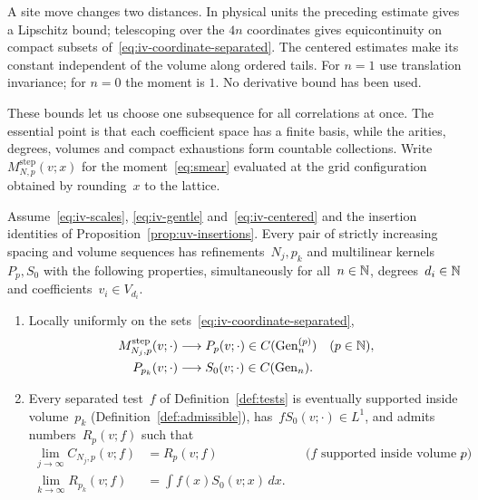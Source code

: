 A site move changes two distances.
In physical units the preceding estimate gives a Lipschitz bound; telescoping over the $4n$ coordinates gives equicontinuity on compact subsets of~\eqref{eq:iv-coordinate-separated}.
The centered estimates make its constant independent of the volume along ordered tails.
For $n=1$ use translation invariance; for $n=0$ the moment is $1$.
No derivative bound has been used.

These bounds let us choose one subsequence for all correlations at once.
The essential point is that each coefficient space has a finite basis, while the arities, degrees, volumes and compact exhaustions form countable collections.
Write~$M^{\mathrm{step}}_{N,p}(v;x)$ for the moment~\eqref{eq:smear} evaluated at the grid configuration obtained by rounding~$x$ to the lattice.

\begin{proposition}\label{prop:iv-raw}
Assume~\eqref{eq:iv-scales}, \eqref{eq:iv-gentle} and~\eqref{eq:iv-centered} and the insertion identities of Proposition~\ref{prop:uv-insertions}.
Every pair of strictly increasing spacing and volume sequences has refinements~$N_j,p_k$ and multilinear kernels~$P_p,S_0$ with the following properties, simultaneously for all~$n\in\mathbb N$, degrees~$d_i\in\mathbb N$ and coefficients~$v_i\in V_{d_i}$.
\begin{enumerate}[label=\textup{(\roman*)},ref=\theproposition(\roman*)]
\item\label{item:iv-raw-points} Locally uniformly on the sets~\eqref{eq:iv-coordinate-separated},
\begin{equation}\label{eq:iv-point-limits}
\begin{aligned}
 M^{\mathrm{step}}_{N_j,p}(v;\cdot)&\longrightarrow P_p(v;\cdot)\in C(\operatorname{Gen}^{(p)}_n)
 &&(p\in\mathbb N),\\
 P_{p_k}(v;\cdot)&\longrightarrow S_0(v;\cdot)\in C(\operatorname{Gen}_n).
\end{aligned}
\end{equation}
\item\label{item:iv-raw-smears} Every separated test~$f$ of Definition~\ref{def:tests} is eventually supported inside volume~$p_k$ (Definition~\ref{def:admissible}), has~$fS_0(v;\cdot)\in L^1$, and admits numbers~$R_p(v;f)$ such that
\begin{equation}\label{eq:iv-auxiliary-limit}
\begin{aligned}
 \lim_{j\to\infty}C_{N_j,p}(v;f)&=R_p(v;f)
 &&\text{($f$ supported inside volume $p$)},\\
 \lim_{k\to\infty}R_{p_k}(v;f)&=\int f(x)S_0(v;x)\,dx.
\end{aligned}
\end{equation}
\end{enumerate}
\end{proposition}

